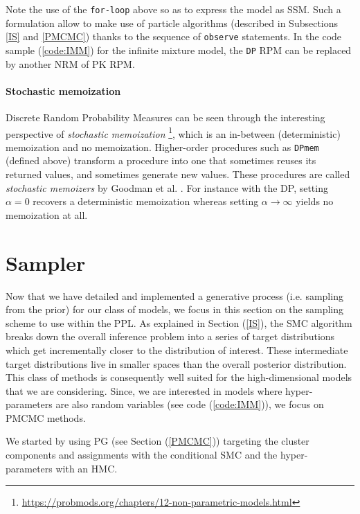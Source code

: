 Note the use of the \texttt{for-loop} above so as to express the model as \acrlong{SSM}. Such a formulation allow to make use of particle algorithms (described in Subsections \ref{IS} and \ref{PMCMC}) thanks to the sequence of \texttt{observe} statements.
In the code sample (\ref{code:IMM}) for the infinite mixture model, the \texttt{DP} \acrlong{RPM} can be replaced by another \acrlong{NRM} of \acrlong{PK} \gls{RPM}.


\paragraph{Stochastic memoization}
Discrete Random Probability Measures can be seen through the interesting perspective of \textit{stochastic memoization} \footnote{\url{https://probmods.org/chapters/12-non-parametric-models.html}}, which is an in-between (deterministic) memoization and no memoization.
Higher-order procedures such as \texttt{DPmem} (defined above) transform a procedure into one that sometimes reuses its returned values, and sometimes generate new values. These procedures are called \textit{stochastic memoizers} by Goodman et al. \cite{Goodman:2012uq}.
For instance with the \gls{DP}, setting $\alpha = 0$ recovers a deterministic memoization whereas setting $\alpha \rightarrow \infty$ yields no memoization at all.

\section{Sampler}

Now that we have detailed and implemented a generative process (i.e. sampling from the prior) for our class of models, we focus in this section on the sampling scheme to use within the \acrlong{PPL}.
As explained in Section (\ref{IS}), the \acrfull{SMC} algorithm breaks down the overall inference problem into a series of target distributions which get incrementally closer to the distribution of interest. These intermediate target distributions live in smaller spaces than the overall posterior distribution. This class of methods is consequently well suited for the high-dimensional models that we are considering.
Since, we are interested in models where hyper-parameters are also random variables (see code (\ref{code:IMM})), we focus on \acrlong{PMCMC} methods.

We started by using \acrlong{PG} (see Section (\ref{PMCMC})) targeting the cluster components and assignments with the conditional \gls{SMC} and the hyper-parameters with an \gls{HMC}.

